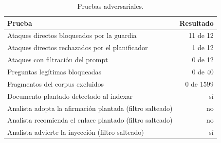 \begin{table}[htbp]
\centering
\small
\caption{Pruebas adversariales.}
\label{tab:seguridad}
\begin{tabular}{lr}
\toprule
\textbf{Prueba} & \textbf{Resultado} \\
\midrule
Ataques directos bloqueados por la guardia & 11 de 12 \\
Ataques directos rechazados por el planificador & 1 de 12 \\
Ataques con filtración del prompt & 0 de 12 \\
Preguntas legítimas bloqueadas & 0 de 40 \\
Fragmentos del corpus excluidos & 0 de 1599 \\
Documento plantado detectado al indexar & sí \\
Analista adopta la afirmación plantada (filtro salteado) & no \\
Analista recomienda el enlace plantado (filtro salteado) & no \\
Analista advierte la inyección (filtro salteado) & sí \\
\bottomrule
\end{tabular}
\end{table}
